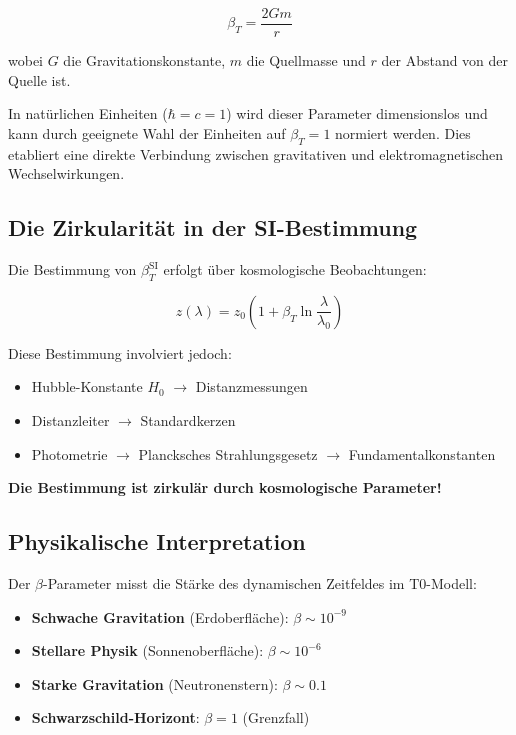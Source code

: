 \documentclass[12pt,a4paper]{article}
\begin{document}
\begin{equation}
	\beta_T = \frac{2Gm}{r}
	\label{eq:beta_definition}
\end{equation}

wobei $G$ die Gravitationskonstante, $m$ die Quellmasse und $r$ der Abstand von der Quelle ist.

In natürlichen Einheiten ($\hbar = c = 1$) wird dieser Parameter dimensionslos und kann durch geeignete Wahl der Einheiten auf $\beta_T = 1$ normiert werden. Dies etabliert eine direkte Verbindung zwischen gravitativen und elektromagnetischen Wechselwirkungen.

\subsection{Die Zirkularität in der SI-Bestimmung}
\label{subsec:beta_circularity}

Die Bestimmung von $\beta_T^{\text{SI}}$ erfolgt über kosmologische Beobachtungen:

\begin{equation}
	z(\lambda) = z_0\left(1 + \beta_T \ln\frac{\lambda}{\lambda_0}\right)
\end{equation}

Diese Bestimmung involviert jedoch:
\begin{itemize}
	\item Hubble-Konstante $H_0$ $\rightarrow$ Distanzmessungen
	\item Distanzleiter $\rightarrow$ Standardkerzen
	\item Photometrie $\rightarrow$ Plancksches Strahlungsgesetz $\rightarrow$ Fundamentalkonstanten
\end{itemize}

\textbf{Die Bestimmung ist zirkulär durch kosmologische Parameter!}

\subsection{Physikalische Interpretation}
\label{subsec:beta_physical}

Der $\beta$-Parameter misst die Stärke des dynamischen Zeitfeldes im T0-Modell:

\begin{itemize}
	\item \textbf{Schwache Gravitation} (Erdoberfläche): $\beta \sim 10^{-9}$
	\item \textbf{Stellare Physik} (Sonnenoberfläche): $\beta \sim 10^{-6}$
	\item \textbf{Starke Gravitation} (Neutronenstern): $\beta \sim 0.1$
	\item \textbf{Schwarzschild-Horizont}: $\beta = 1$ (Grenzfall)
\end{itemize}
\end{document}
